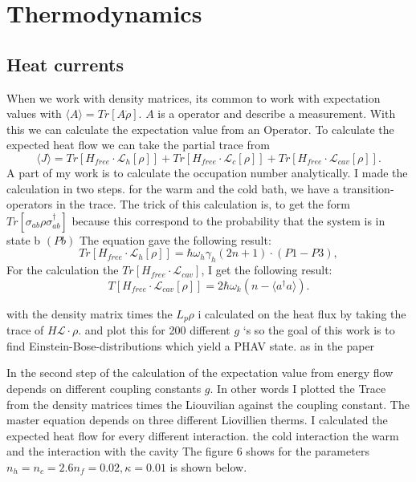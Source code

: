 \documentclass[12pt,a4paper]{article}
\begin{document}
\section{Thermodynamics}
\subsection{Heat currents}

 When we work with density matrices, its common to work with expectation values with $\langle A \rangle=Tr[A\dot{\rho}]$.
 $A$ is a operator and describe a measurement.
With this we can calculate the expectation value from an Operator. 
To calculate the expected heat flow we can take the partial trace from 
\begin{equation}
\langle J\rangle=Tr[H_{free}\cdot \mathcal{L}_h[\rho]]+Tr[H_{free}\cdot \mathcal{L}_c[\rho]]+Tr[H_{free}\cdot \mathcal{L}_{cav}[\rho]].
\end{equation}
A part of my work is to calculate the occupation number analytically. 
I made the calculation in two steps. for the warm and the cold bath, we have a transition-operators in the trace.
The trick of this calculation is, to get the form $Tr[\sigma_{ab}\rho \sigma_{ab}^{\dag{}}]$ because this correspond to the probability that the system is in state b $(Pb)$
The equation gave the following result:
\begin{equation}
Tr[H_{free}\cdot \mathcal{L}_h[\rho]]=\hbar \omega_h \gamma_h (2n+1) \cdot( P1-P3) ,
\end{equation}
For the calculation the $Tr[H_{free}\cdot \mathcal{L}_{cav}]$, I get the following result:
\begin{equation}
T[H_{free}\cdot \mathcal{L}_{cav}[\rho]]=2\hbar \omega_k (n-\langle a^{\dag{}}a \rangle).
\end{equation}

with the density matrix times the $L_{p}\rho$ i calculated on the heat flux by taking the trace of $H \mathcal{L}\cdot \rho$. 
and plot this for 200 different  $g$ `s 
so the goal of this work is to find Einstein-Bose-distributions which yield a PHAV state.
as in the paper \cite{Allevi2013} 

In the second step of the calculation of the  expectation value from energy flow depends on different coupling constants $g$.
In other words I plotted the Trace from the density matrices times the Liouvilian against the coupling constant.
The master equation depends on three different Liovillien therms. I calculated the expected heat flow for every different interaction. the cold interaction the warm and the interaction with the cavity
The figure 6 shows  for the parameters $n_h=n_c=2.6 n_f=0.02,\kappa=0.01 $ is shown below.
\end{document}
